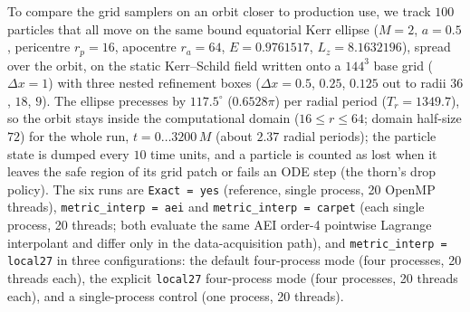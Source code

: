 \documentclass[11pt]{article}
\begin{document}
To compare the grid samplers on an orbit closer to production use,
we track $100$ particles that all move on the same bound equatorial Kerr
ellipse ($M=2$, $a=0.5$, pericentre $r_p = 16$, apocentre $r_a = 64$,
$E = 0.9761517$, $L_z = 8.1632196$), spread over the orbit, on the static
Kerr--Schild field written onto a $144^3$ base grid ($\Delta x = 1$) with
three nested refinement boxes ($\Delta x = 0.5$, $0.25$, $0.125$ out to
radii $36$, $18$, $9$).  The ellipse precesses by $117.5^\circ$
($0.6528\pi$) per radial period ($T_r = 1349.7$), so the orbit stays
inside the computational domain ($16 \le r \le 64$; domain half-size
$72$) for the whole run, $t = 0 \ldots 3200\,M$ (about $2.37$ radial
periods); the particle state is dumped every $10$ time units, and a
particle is counted as lost
when it leaves the safe region of its grid patch or fails an ODE step
(the thorn's drop policy).  The six runs are \texttt{Exact = yes}
(reference, single process, 20 OpenMP threads),
\texttt{metric\_interp = aei} and \texttt{metric\_interp = carpet}
(each single process, 20 threads; both evaluate the same AEI order-4
pointwise Lagrange interpolant and differ only in the
data-acquisition path), and \texttt{metric\_interp = local27} in three
configurations: the default four-process mode (four processes, 20
threads each), the explicit \texttt{local27} four-process mode (four
processes, 20 threads each), and a single-process control (one process,
20 threads).
\end{document}
